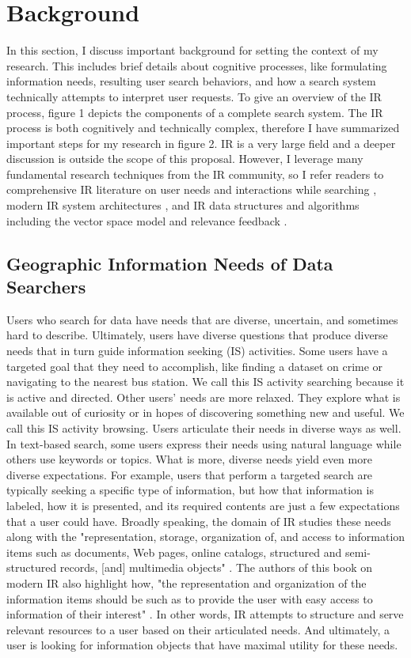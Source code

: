 \chapter{Background} \label{ch:[chapter 2 label]}

In this section, I discuss important background for setting the context of my research. This includes brief details about cognitive processes, like formulating information needs, resulting user search behaviors, and how a search system technically attempts to interpret user requests. To give an overview of the IR process, figure 1 depicts the components of a complete search system. The IR  process is both cognitively and technically complex, therefore I have summarized important steps for my research in figure 2. IR is a very large field and a deeper discussion is outside the scope of this proposal. However, I leverage many fundamental research techniques from the IR community, so I refer readers to comprehensive IR literature on user needs and interactions while searching \cite{White2016}, modern IR system architectures \cite{Baeza-Yates1999}, and IR data structures and algorithms including the vector space model and relevance feedback \cite{Buckley1985}.

\section{Geographic Information Needs of Data Searchers}

Users who search for data have needs that are diverse, uncertain, and sometimes hard to describe. Ultimately, users have diverse questions that produce diverse needs that in turn guide information seeking (IS) activities. Some users have a targeted goal that they need to accomplish, like finding a dataset on crime or navigating to the nearest bus station. We call this IS activity searching because it is active and directed. Other users' needs are more relaxed. They explore what is available out of curiosity or in hopes of discovering something new and useful. We call this IS activity browsing. Users articulate their needs in diverse ways as well. In text-based search, some users express their needs using natural language while others use keywords or topics. What is more, diverse needs yield even more diverse expectations. For example, users that perform a targeted search are typically seeking a specific type of information, but how that information is labeled, how it is presented, and its required contents are just a few expectations that a user could have. Broadly speaking, the domain of IR studies these needs along with the "representation, storage, organization of, and access to information items such as documents, Web pages, online catalogs, structured and semi-structured records, [and] multimedia objects" \cite{Baeza-Yates1999}. The authors of this book on modern IR also highlight how, "the representation and organization of the information items should be such as to provide the user with easy access to information of their interest" \cite{Baeza-Yates1999}. In other words, IR attempts to structure and serve relevant resources to a user based on their articulated needs. And ultimately, a user is looking for information objects that have maximal utility for these needs.

